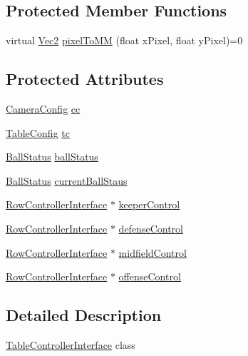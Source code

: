 \subsection*{Protected Member Functions}
\begin{DoxyCompactItemize}
\item 
virtual \hyperlink{class_vec2}{Vec2} \hyperlink{class_table_controller_interface_a26c1aa23fd09f8d16e4c6437ca8e8b4d}{pixel\+To\+MM} (float x\+Pixel, float y\+Pixel)=0
\end{DoxyCompactItemize}
\subsection*{Protected Attributes}
\begin{DoxyCompactItemize}
\item 
\hyperlink{class_camera_config}{Camera\+Config} \hyperlink{class_table_controller_interface_a7ab0e77a798396d103c1207cba356efd}{cc}
\item 
\hyperlink{class_table_config}{Table\+Config} \hyperlink{class_table_controller_interface_a112a9a0793cc792d806e9a9a233f4660}{tc}
\item 
\hyperlink{class_ball_status}{Ball\+Status} \hyperlink{class_table_controller_interface_a7702c8ead7d136123d0c468dc6dff3d8}{ball\+Status}
\item 
\hyperlink{class_ball_status}{Ball\+Status} \hyperlink{class_table_controller_interface_aa23a172e69f26ef5e9f486ca16c9fb3f}{current\+Ball\+Staus}
\item 
\hyperlink{class_row_controller_interface}{Row\+Controller\+Interface} $\ast$ \hyperlink{class_table_controller_interface_a9763775aec558eacdb6b83abdb45f92c}{keeper\+Control}
\item 
\hyperlink{class_row_controller_interface}{Row\+Controller\+Interface} $\ast$ \hyperlink{class_table_controller_interface_ae0a4e4b7b5994a63f21747c60e84ec9e}{defense\+Control}
\item 
\hyperlink{class_row_controller_interface}{Row\+Controller\+Interface} $\ast$ \hyperlink{class_table_controller_interface_a66d25e2a9a6b1a082bb186b8421e52d9}{midfield\+Control}
\item 
\hyperlink{class_row_controller_interface}{Row\+Controller\+Interface} $\ast$ \hyperlink{class_table_controller_interface_ab49517ee302de99b1376a5b3781cb7f9}{offense\+Control}
\end{DoxyCompactItemize}


\subsection{Detailed Description}
\hyperlink{class_table_controller_interface}{Table\+Controller\+Interface} class 

